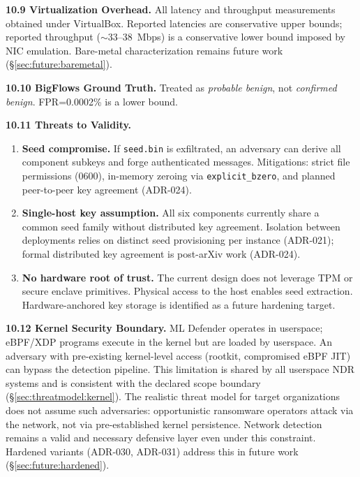 \documentclass[11pt,a4paper]{article}
\begin{document}
    \textbf{10.9 Virtualization Overhead.} All latency and throughput measurements obtained
    under VirtualBox. Reported latencies are conservative upper bounds; reported throughput
    (${\sim}$33--38~Mbps) is a conservative lower bound imposed by NIC emulation. Bare-metal
    characterization remains future work (\S\ref{sec:future:baremetal}).

    \textbf{10.10 BigFlows Ground Truth.} Treated as \emph{probable benign}, not
    \emph{confirmed benign}. FPR=0.0002\% is a lower bound.

    \textbf{10.11 Threats to Validity.}

    \begin{enumerate}
        \item \textbf{Seed compromise.} If \texttt{seed.bin} is exfiltrated, an adversary
        can derive all component subkeys and forge authenticated messages. Mitigations:
        strict file permissions (0600), in-memory zeroing via \texttt{explicit\_bzero},
        and planned peer-to-peer key agreement (ADR-024).

        \item \textbf{Single-host key assumption.} All six components currently share a
        common seed family without distributed key agreement. Isolation between deployments
        relies on distinct seed provisioning per instance (ADR-021); formal distributed key
        agreement is post-arXiv work (ADR-024).

        \item \textbf{No hardware root of trust.} The current design does not leverage TPM
        or secure enclave primitives. Physical access to the host enables seed extraction.
        Hardware-anchored key storage is identified as a future hardening target.

    \end{enumerate}

    \textbf{10.12 Kernel Security Boundary.} ML Defender operates in userspace; eBPF/XDP
    programs execute in the kernel but are loaded by userspace. An adversary with
    pre-existing kernel-level access (rootkit, compromised eBPF JIT) can bypass the
    detection pipeline. This limitation is shared by all userspace NDR systems and is
    consistent with the declared scope boundary (\S\ref{sec:threatmodel:kernel}).
    The realistic threat model for target organizations does not assume such adversaries:
    opportunistic ransomware operators attack via the network, not via pre-established
    kernel persistence. Network detection remains a valid and necessary defensive layer
    even under this constraint. Hardened variants (ADR-030, ADR-031) address this in
    future work (\S\ref{sec:future:hardened}).
\end{document}

